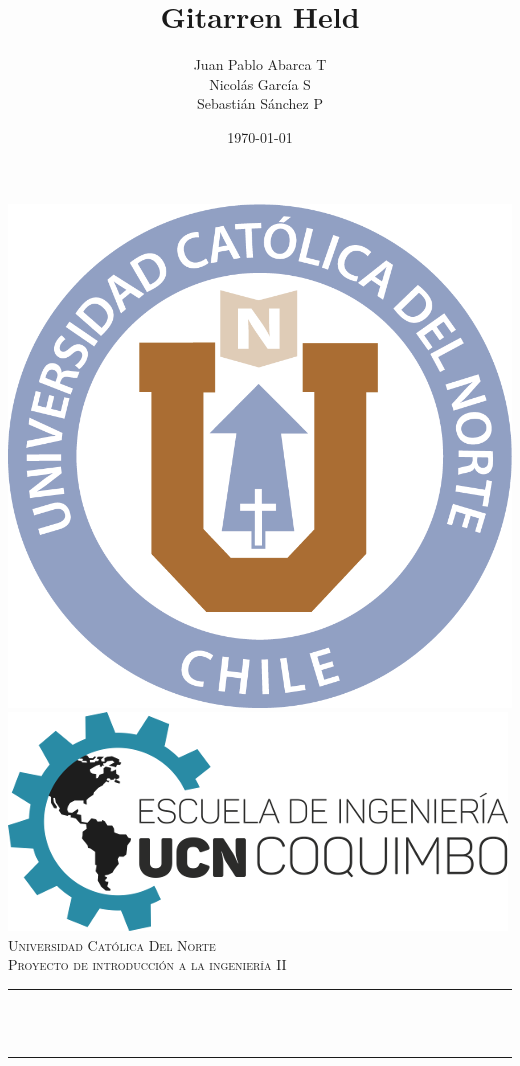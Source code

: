 \documentclass[12pt]{article}
\title{Gitarren Held}					%
\author{Juan Pablo Abarca T\\
        Nicolás García S\\
        Sebastián Sánchez P}					%
\date{\today}						%
\makeatletter
\let\thetitle\@title
\makeatother
\begin{document}

\begin{titlepage}
	\centering
    \vspace*{0.0 cm}
    \includegraphics[scale = 0.5]{ucn.png}\\[1.0 cm]	%
    \includegraphics[scale = 2]{logo.png}\\[1.0 cm]	%
    \textsc{\LARGE Universidad Católica Del Norte}\\[0.5 cm]	%
	\textsc{\large Proyecto de introducción a la ingeniería II}\\[0.5 cm]		%
	\rule{\linewidth}{0.2 mm} \\[0.4 cm]
	{ \huge \bfseries \thetitle}\\
	\rule{\linewidth}{0.2 mm} \\[1.5 cm]
	

\end{titlepage}
\end{document}
